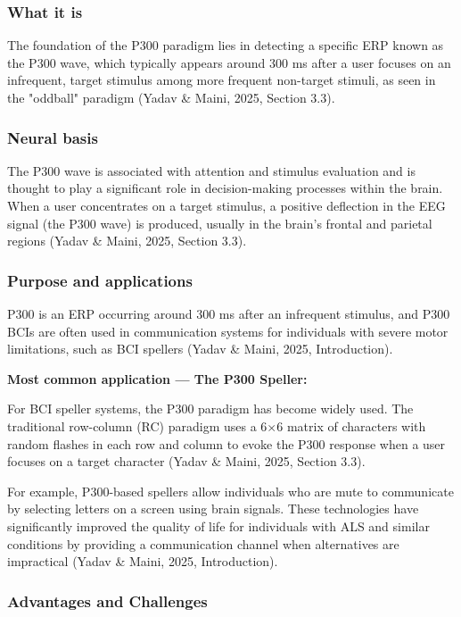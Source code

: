 \documentclass[12pt]{article}
\begin{document}
\subsubsection{What it is}

The foundation of the P300 paradigm lies in detecting a specific ERP known as the P300 wave, which typically appears around 300 ms after a user focuses on an infrequent, target stimulus among more frequent non-target stimuli, as seen in the "oddball" paradigm (Yadav \& Maini, 2025, Section 3.3).

\subsubsection{Neural basis}

The P300 wave is associated with attention and stimulus evaluation and is thought to play a significant role in decision-making processes within the brain. When a user concentrates on a target stimulus, a positive deflection in the EEG signal (the P300 wave) is produced, usually in the brain's frontal and parietal regions (Yadav \& Maini, 2025, Section 3.3).

\subsubsection{Purpose and applications}

P300 is an ERP occurring around 300 ms after an infrequent stimulus, and P300 BCIs are often used in communication systems for individuals with severe motor limitations, such as BCI spellers (Yadav \& Maini, 2025, Introduction).

\textbf{Most common application — The P300 Speller:}

For BCI speller systems, the P300 paradigm has become widely used. The traditional row-column (RC) paradigm uses a 6$\times$6 matrix of characters with random flashes in each row and column to evoke the P300 response when a user focuses on a target character (Yadav \& Maini, 2025, Section 3.3).

For example, P300-based spellers allow individuals who are mute to communicate by selecting letters on a screen using brain signals. These technologies have significantly improved the quality of life for individuals with ALS and similar conditions by providing a communication channel when alternatives are impractical (Yadav \& Maini, 2025, Introduction).

\subsubsection{Advantages and Challenges}
\end{document}
